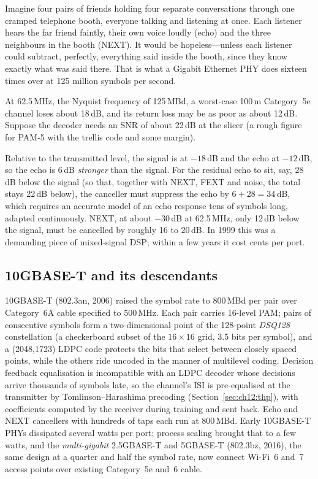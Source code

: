 \begin{analogy}
Imagine four pairs of friends holding four separate conversations through one cramped telephone
booth, everyone talking and listening at once. Each listener hears the far friend faintly, their
own voice loudly (echo) and the three neighbours in the booth (NEXT). It would be hopeless---unless
each listener could subtract, perfectly, everything said inside the booth, since they know exactly
what was said there. That is what a Gigabit Ethernet PHY does sixteen times over at 125 million
symbols per second.
\end{analogy}



\begin{worked}
At 62.5\,MHz, the Nyquist frequency of 125\,MBd, a worst-case 100\,m Category~5e channel loses about
18\,dB, and its return loss may be as poor as about 12\,dB. Suppose the decoder needs an SNR of
about 22\,dB at the slicer (a rough figure for PAM-5 with the trellis code and some margin).

Relative to the transmitted level, the signal is at $-18$\,dB and the echo at $-12$\,dB, so the echo
is 6\,dB \emph{stronger} than the signal. For the residual echo to sit, say, 28\,dB below the signal
(so that, together with NEXT, FEXT and noise, the total stays 22\,dB below), the canceller must
suppress the echo by $6+28=34$\,dB, which requires an accurate model of an echo response tens of
symbols long, adapted continuously. NEXT, at about $-30$\,dB at 62.5\,MHz, only 12\,dB below the signal, must be
cancelled by roughly 16 to 20\,dB. In 1999 this was a demanding piece of mixed-signal DSP; within a few years it
cost cents per port.
\end{worked}

\subsection{10GBASE-T and its descendants}

10GBASE-T (802.3an, 2006) raised the symbol rate to 800\,MBd per pair over Category~6A cable
specified to 500\,MHz. Each pair carries 16-level PAM; pairs of consecutive symbols form a
two-dimensional point of the 128-point \emph{DSQ128} constellation (a checkerboard subset of the
$16\times16$ grid, 3.5 bits per symbol), and a (2048,1723) LDPC code protects the bits that select
between closely spaced points, while the others ride uncoded in the manner of multilevel coding.
Decision feedback equalisation is incompatible with an LDPC decoder whose decisions arrive thousands
of symbols late, so the channel's ISI is pre-equalised at the transmitter by Tomlinson--Harashima
precoding (Section~\ref{sec:ch12:thp}), with coefficients computed by the receiver during training and
sent back. Echo and NEXT cancellers with hundreds of taps each run at 800\,MBd. Early 10GBASE-T PHYs
dissipated several watts per port; process scaling brought that to a few watts, and the
\emph{multi-gigabit} 2.5GBASE-T and 5GBASE-T (802.3bz, 2016), the same design at a quarter and half the
symbol rate, now connect Wi-Fi~6 and~7 access points over existing Category~5e and~6 cable.


